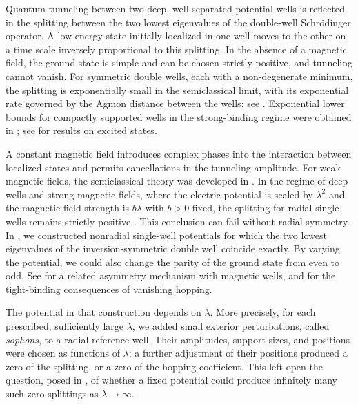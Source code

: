 \documentclass[11pt]{article}
\begin{document}
Quantum tunneling between two deep, well-separated potential wells is
reflected in the splitting between the two lowest eigenvalues of the
double-well Schr\"odinger operator. A low-energy state initially localized
in one well moves to the other on a time scale inversely proportional to
this splitting. In the absence of a magnetic field, the ground state is
simple and can be chosen strictly positive, and tunneling cannot vanish.
For symmetric double wells, each with a non-degenerate minimum, the
splitting is exponentially small in the semiclassical limit, with its
exponential rate governed by the Agmon distance between the wells; see
\cite{HS84,Simon84}. Exponential lower bounds for compactly supported wells
in the strong-binding regime were obtained in \cite{FLW18}; see
\cite{FSW-excited} for results on excited states.

A constant magnetic field introduces complex phases into the interaction
between localized states and permits cancellations in the tunneling
amplitude. For weak magnetic fields, the semiclassical theory was developed
in \cite{HS87}. In the regime of deep wells and strong magnetic fields,
where the electric potential is scaled by $\lambda^2$ and the magnetic field
strength is $b\lambda$ with $b>0$ fixed, the splitting for radial single wells
remains strictly positive \cite{FSW22,HK24,Mor24}. This conclusion can fail
without radial symmetry. In \cite{FSW-PNAS,FSW-absence}, we constructed nonradial
single-well potentials for which the two lowest eigenvalues of the
inversion-symmetric double well coincide exactly. By varying the potential,
we could also change the parity of the ground state from even to odd.
See \cite{EM25} for a related asymmetry mechanism with magnetic wells, and
\cite{SW22} for the tight-binding consequences of vanishing hopping.

The potential in that construction depends on $\lambda$. More precisely,
for each prescribed, sufficiently large $\lambda$, we added small exterior
perturbations, called \emph{sophons}, to a radial reference well. Their
amplitudes, support sizes, and positions were chosen as functions of
$\lambda$; a further adjustment of their positions produced a zero of the
splitting, or a zero of the hopping coefficient. This left open the
question, posed in \cite{FSW-PNAS}, of whether a fixed potential could
produce infinitely many such zero splittings as $\lambda\to\infty$.
\end{document}
